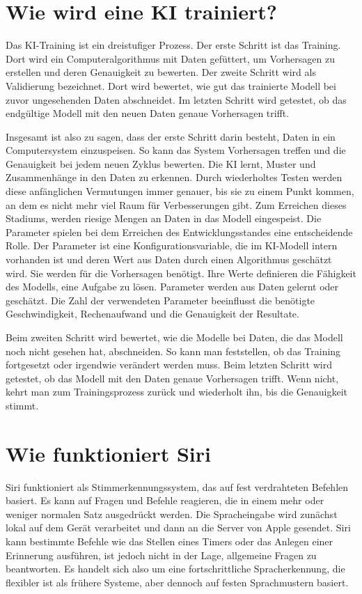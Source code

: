 \documentclass{article}
\begin{document}
\section{Wie wird eine KI trainiert?}
Das KI-Training ist ein dreistufiger Prozess. Der erste Schritt ist das Training. Dort wird ein Computeralgorithmus mit Daten gefüttert, um Vorhersagen zu erstellen und deren Genauigkeit zu bewerten. Der zweite Schritt wird als Validierung bezeichnet. Dort wird bewertet, wie gut das trainierte Modell bei zuvor ungesehenden Daten abschneidet. Im letzten Schritt wird getestet, ob das endgültige Modell mit den neuen Daten genaue Vorhersagen trifft.

Insgesamt ist also zu sagen, dass der erste Schritt darin besteht, Daten in ein Computersystem einzuspeisen. So kann das System Vorhersagen treffen und die Genauigkeit bei jedem neuen Zyklus bewerten. Die KI lernt, Muster und Zusammenhänge in den Daten zu erkennen. Durch wiederholtes Testen werden diese anfänglichen Vermutungen immer genauer, bis sie zu einem Punkt kommen, an dem es nicht mehr viel Raum für Verbesserungen gibt. Zum Erreichen dieses Stadiums, werden riesige Mengen an Daten in das Modell eingespeist. Die Parameter spielen bei dem Erreichen des Entwicklungsstandes eine entscheidende Rolle. Der Parameter ist eine Konfigurationsvariable, die im KI-Modell intern vorhanden ist und deren Wert aus Daten durch einen Algorithmus geschätzt wird. Sie werden für die Vorhersagen benötigt. Ihre Werte definieren die Fähigkeit des Modells, eine Aufgabe zu lösen. Parameter werden aus Daten gelernt oder geschätzt. Die Zahl der verwendeten Parameter beeinflusst die benötigte Geschwindigkeit, Rechenaufwand und die Genauigkeit der Resultate. 


Beim zweiten Schritt wird bewertet, wie die Modelle bei Daten, die das Modell noch nicht gesehen hat, abschneiden. So kann man feststellen, ob das Training fortgesetzt oder irgendwie verändert werden muss. 
Beim letzten Schritt wird getestet, ob das Modell mit den Daten genaue Vorhersagen trifft. Wenn nicht, kehrt man zum Trainingsprozess zurück und wiederholt ihn, bis die Genauigkeit stimmt.


\section{Wie funktioniert Siri}
Siri funktioniert als Stimmerkennungssystem, das auf fest verdrahteten Befehlen basiert. Es kann auf Fragen und Befehle reagieren, die in einem mehr oder weniger normalen Satz ausgedrückt werden. Die Spracheingabe wird zunächst lokal auf dem Gerät verarbeitet und dann an die Server von Apple gesendet. Siri kann bestimmte Befehle wie das Stellen eines Timers oder das Anlegen einer Erinnerung ausführen, ist jedoch nicht in der Lage, allgemeine Fragen zu beantworten. Es handelt sich also um eine fortschrittliche Spracherkennung, die flexibler ist als frühere Systeme, aber dennoch auf festen Sprachmustern basiert.
\end{document}
